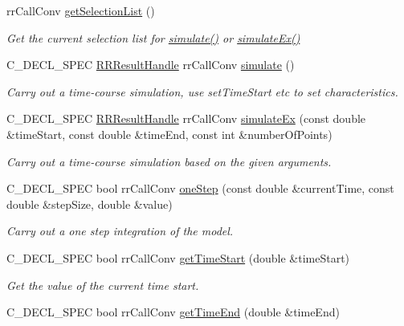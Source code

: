 \begin{DoxyCompactItemize}
rr\-Call\-Conv \hyperlink{group__loadsave_ga1db0b86ed7fd0d6e19f8df85b7577253}{get\-Selection\-List} ()
\begin{DoxyCompactList}\small\item\em \-Get the current selection list for \hyperlink{group__simulation_ga9f0555c11716daec2336d54d13facc57}{simulate()} or \hyperlink{group__simulation_ga9b87919e79f6eb0d7c77c3daa08d6baf}{simulate\-Ex()} \end{DoxyCompactList}\item 
\-C\-\_\-\-D\-E\-C\-L\-\_\-\-S\-P\-E\-C \hyperlink{rr__c__types_8h_a8c364bbdef9aab31c89655c38461da51}{\-R\-R\-Result\-Handle} \*
rr\-Call\-Conv \hyperlink{group__loadsave_ga9f0555c11716daec2336d54d13facc57}{simulate} ()
\begin{DoxyCompactList}\small\item\em \-Carry out a time-\/course simulation, use set\-Time\-Start etc to set characteristics. \end{DoxyCompactList}\item 
\-C\-\_\-\-D\-E\-C\-L\-\_\-\-S\-P\-E\-C \hyperlink{rr__c__types_8h_a8c364bbdef9aab31c89655c38461da51}{\-R\-R\-Result\-Handle} \*
rr\-Call\-Conv \hyperlink{group__loadsave_ga9b87919e79f6eb0d7c77c3daa08d6baf}{simulate\-Ex} (const double \&time\-Start, const double \&time\-End, const int \&number\-Of\-Points)
\begin{DoxyCompactList}\small\item\em \-Carry out a time-\/course simulation based on the given arguments. \end{DoxyCompactList}\item 
\-C\-\_\-\-D\-E\-C\-L\-\_\-\-S\-P\-E\-C bool rr\-Call\-Conv \hyperlink{group__loadsave_ga190fff177accdfbc9c192c4993807e2e}{one\-Step} (const double \&current\-Time, const double \&step\-Size, double \&value)
\begin{DoxyCompactList}\small\item\em \-Carry out a one step integration of the model. \end{DoxyCompactList}\item 
\-C\-\_\-\-D\-E\-C\-L\-\_\-\-S\-P\-E\-C bool rr\-Call\-Conv \hyperlink{group__loadsave_ga18b4fbd0dc5aa3f25d58367a406f425c}{get\-Time\-Start} (double \&time\-Start)
\begin{DoxyCompactList}\small\item\em \-Get the value of the current time start. \end{DoxyCompactList}\item 
\-C\-\_\-\-D\-E\-C\-L\-\_\-\-S\-P\-E\-C bool rr\-Call\-Conv \hyperlink{group__loadsave_ga451e7ecddd0431316048a332410b0600}{get\-Time\-End} (double \&time\-End)

\end{DoxyCompactItemize}
